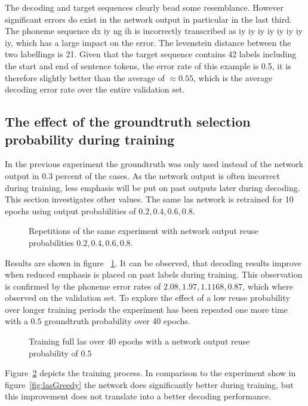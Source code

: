The decoding and target sequences clearly bead some resemblance. However significant errors do exist in the network output in particular in the last third. The phoneme sequence dx  iy  ng  ih is incorrectly transcribed as iy  iy  iy  iy  iy  iy  iy iy,
which has a large impact on the error. The levenstein distance between the two labellings is 21. Given that the target sequence contains 42 labels including the start and end of sentence tokens, the error rate of this example is 0.5, it is therefore slightly better than the average of $\approx 0.55$, which is the average decoding error rate over the entire validation set.


\subsection{The effect of the groundtruth selection probability during training}
In the previous experiment the groundtruth was only used instead of the network output in 0.3 percent of the cases. As the network output is often incorrect during training, less emphasis will be put on past outputs later during decoding. This section investigates
other values. The same las network is retrained for 10 epochs using output probabilities of $0.2,0.4,0.6,0.8$.
\begin{figure}




\caption{Repetitions of the same experiment with network output reuse probabilities $0.2, 0.4, 0.6, 0.8$. }
\label{fig:lasGreedy2468}
\end{figure}
Results are shown in figure ~\ref{fig:lasGreedy2468}. It can be observed, that decoding results improve when reduced emphasis is placed on past labels during training. This observation is confirmed by the phoneme error rates of $2.08, 1.97, 1.1168, 0.87$, which where observed on the validation set.
To explore the effect of a low reuse probability over longer training periods the experiment has been repeated one more time with a $0.5$ groundtruth probability over 40 epochs.
\begin{figure}


\caption{Training full las over 40 epochs with a network output reuse probability of $0.5$}
\label{fig:lasGreedy05}
\end{figure}
Figure~\ref{fig:lasGreedy05} depicts the training process. In comparison to the experiment show in figure~\ref{fig:lasGreedy} the network does significantly better during training, but
this improvement does not translate into a better decoding performance.

